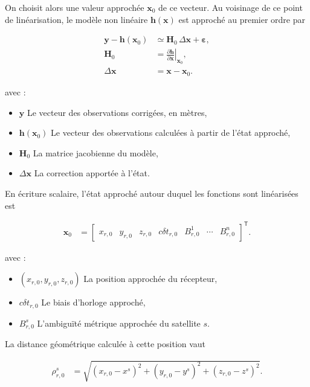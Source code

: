 On choisit alors une valeur approchée $\mathbf x_0$ de ce vecteur. Au voisinage
de ce point de linéarisation, le modèle non linéaire
$\mathbf h(\mathbf x)$ est approché au premier ordre par

\begin{align}
\mathbf y-\mathbf h(\mathbf x_0)
&\simeq
\mathbf H_0\,\Delta\mathbf x+\boldsymbol\varepsilon,
\\
\mathbf H_0
&=
\left.
\frac{\partial\mathbf h}{\partial\mathbf x}
\right|_{\mathbf x_0},
\\
\Delta\mathbf x
&=
\mathbf x-\mathbf x_0.
\label{ann:eq:linearized_model}
\end{align}

avec :

\begin{itemize}
    \item $\mathbf y$ Le vecteur des observations corrigées, en mètres,
    \item $\mathbf h(\mathbf x_0)$ Le vecteur des observations calculées à
    partir de l'état approché,
    \item $\mathbf H_0$ La matrice jacobienne du modèle,
    \item $\Delta\mathbf x$ La correction apportée à l'état.
\end{itemize}

En écriture scalaire, l'état approché autour duquel les fonctions sont
linéarisées est

\begin{align}
\mathbf x_0
&=
\begin{bmatrix}
x_{r,0} & y_{r,0} & z_{r,0} & c\delta t_{r,0} &
B_{r,0}^{1} & \cdots & B_{r,0}^{n}
\end{bmatrix}^{\mathsf T}.
\label{ann:eq:approximate_state}
\end{align}

avec :

\begin{itemize}
    \item $(x_{r,0},y_{r,0},z_{r,0})$ La position approchée du récepteur,
    \item $c\delta t_{r,0}$ Le biais d'horloge approché,
    \item $B_{r,0}^{s}$ L'ambiguïté métrique approchée du satellite $s$.
\end{itemize}

La distance géométrique calculée à cette position vaut

\begin{align}
\rho_{r,0}^s
&=
\sqrt{(x_{r,0}-x^s)^2+(y_{r,0}-y^s)^2+(z_{r,0}-z^s)^2}.
\label{ann:eq:geometric_range_at_initial_state}
\end{align}

